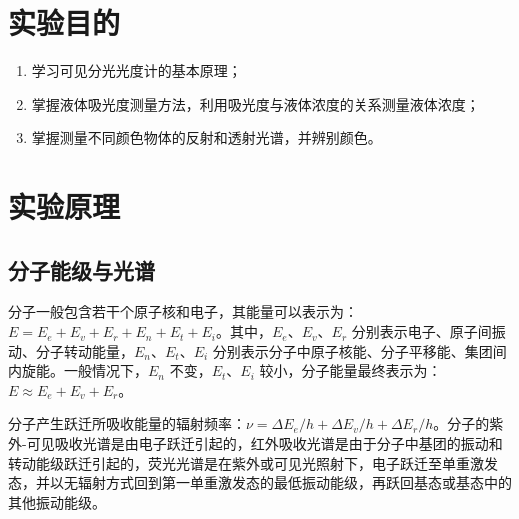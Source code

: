 
\section{实验目的}

\begin{enumerate}[label=\arabic*、, leftmargin=4em, labelsep=0pt]
    \item 学习可见分光光度计的基本原理；
    \item 掌握液体吸光度测量方法，利用吸光度与液体浓度的关系测量液体浓度；
    \item 掌握测量不同颜色物体的反射和透射光谱，并辨别颜色。
\end{enumerate}

\section{实验原理}

\subsection{分子能级与光谱}

分子一般包含若干个原子核和电子，其能量可以表示为：$E = E_e + E_v + E_r + E_n + E_t + E_i$。其中，$E_e$、$E_v$、$E_r$ 分别表示电子、原子间振动、分子转动能量，$E_n$、$E_t$、$E_i$ 分别表示分子中原子核能、分子平移能、集团间内旋能。一般情况下，$E_n$ 不变，$E_t$、$E_i$ 较小，分子能量最终表示为：$E \approx E_e + E_v + E_r$。

分子产生跃迁所吸收能量的辐射频率：$\nu = \Delta E_e/h + \Delta E_v/h + \Delta E_r/h$。分子的紫外-可见吸收光谱是由电子跃迁引起的，红外吸收光谱是由于分子中基团的振动和转动能级跃迁引起的，荧光光谱是在紫外或可见光照射下，电子跃迁至单重激发态，并以无辐射方式回到第一单重激发态的最低振动能级，再跃回基态或基态中的其他振动能级。


